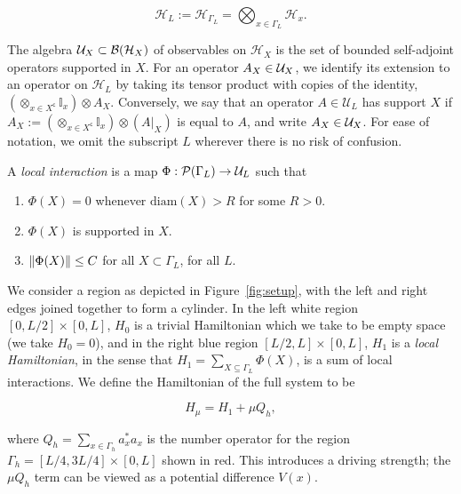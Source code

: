 \documentclass[12pt, letterpaper]{article}
\begin{document}
\[\mathcal{H}_L := \mathcal{H}_{\Gamma_L} = \bigotimes_{x \in \Gamma_L}\mathcal{H}_x.\] 


The algebra $\mathcal{U}_X \subset \mathcal{B}(\mathcal{H}_X)$ of observables on $\mathcal{H}_X$ is the set of bounded self-adjoint operators supported in $X$. For an operator $A_X \in \mathcal{U}_X$, we identify its extension to an operator on $\mathcal{H}_L$ by taking its tensor product with copies of the identity, $(\otimes_{x \in X^\mathsf{c}} \mathbb{I}_x) \otimes A_X$. Conversely, we say that an operator $A \in \mathcal{U}_L$ has support $X$ if $A_X := (\otimes_{x \in X^\mathsf{c}} \mathbb{I}_x)\otimes (A|_{X})$ is equal to $A$, and write $A_X \in \mathcal{U}_X$. For ease of notation, we omit the subscript $L$ wherever there is no risk of confusion.

A \textit{local interaction} is a map $\Phi : \mathcal{P}(\Gamma_L) \to \mathcal{U}_L$ such that 

\begin{enumerate}

\item $\Phi(X) = 0$ whenever $\text{diam}(X) > R$ for some $R>0$.

\item $\Phi(X)$ is supported in $X$.

\item $\lVert \Phi(X) \rVert \leq C$ for all $X \subset \Gamma_L$, for all $L$.

\end{enumerate}

We consider a region as depicted in Figure~\ref{fig:setup}, with the left and right edges joined together to form a cylinder. In the left white region $[0,L/2] \times [0,L]$, $H_0$ is a trivial Hamiltonian which we take to be empty space (we take $H_0=0$), and in the right blue region $[L/2,L]\times [0,L]$, $H_1$ is a \textit{local Hamiltonian}, in the sense that $H_1 = \sum_{X \subseteq \Gamma_L} \Phi(X)$, is a sum of local interactions. We define the Hamiltonian of the full system to be 

\[H_\mu = H_1 + \mu Q_h,\]

where $Q_h = \sum_{x \in \Gamma_h} a_x^*a_x$ is the number operator for the region $\Gamma_h = [L/4,3L/4] \times [0,L]$ shown in red. This introduces a driving strength; the $\mu Q_h$ term can be viewed as a potential difference $V(x)$.
\end{document}
